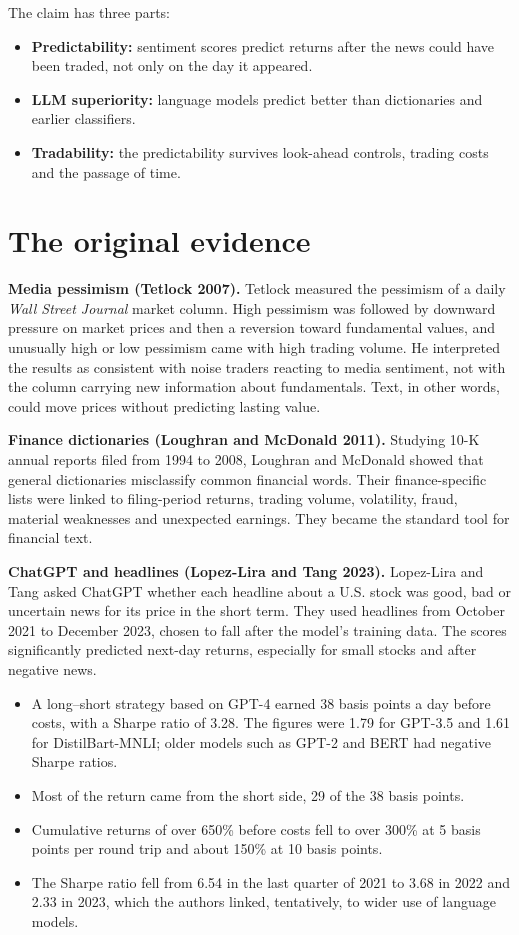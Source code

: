 The claim has three parts:

\begin{itemize}
  \item \textbf{Predictability:} sentiment scores predict returns after the news could have been traded, not only on the day it appeared.
  \item \textbf{LLM superiority:} language models predict better than dictionaries and earlier classifiers.
  \item \textbf{Tradability:} the predictability survives look-ahead controls, trading costs and the passage of time.
\end{itemize}

\section{The original evidence}
\label{sec:23-evidence}

\textbf{Media pessimism (Tetlock 2007).} Tetlock measured the pessimism of a daily \emph{Wall Street Journal} market column. High pessimism was followed by downward pressure on market prices and then a reversion toward fundamental values, and unusually high or low pessimism came with high trading volume. He interpreted the results as consistent with noise traders reacting to media sentiment, not with the column carrying new information about fundamentals. Text, in other words, could move prices without predicting lasting value.

\textbf{Finance dictionaries (Loughran and McDonald 2011).} Studying 10-K annual reports filed from 1994 to 2008, Loughran and McDonald showed that general dictionaries misclassify common financial words. Their finance-specific lists were linked to filing-period returns, trading volume, volatility, fraud, material weaknesses and unexpected earnings. They became the standard tool for financial text.

\textbf{ChatGPT and headlines (Lopez-Lira and Tang 2023).} Lopez-Lira and Tang asked ChatGPT whether each headline about a U.S. stock was good, bad or uncertain news for its price in the short term. They used headlines from October 2021 to December 2023, chosen to fall after the model's training data. The scores significantly predicted next-day returns, especially for small stocks and after negative news.

\begin{itemize}
  \item A long--short strategy based on GPT-4 earned 38 basis points a day before costs, with a Sharpe ratio of 3.28. The figures were 1.79 for GPT-3.5 and 1.61 for DistilBart-MNLI; older models such as GPT-2 and BERT had negative Sharpe ratios.
  \item Most of the return came from the short side, 29 of the 38 basis points.
  \item Cumulative returns of over 650\% before costs fell to over 300\% at 5 basis points per round trip and about 150\% at 10 basis points.
  \item The Sharpe ratio fell from 6.54 in the last quarter of 2021 to 3.68 in 2022 and 2.33 in 2023, which the authors linked, tentatively, to wider use of language models.
\end{itemize}

